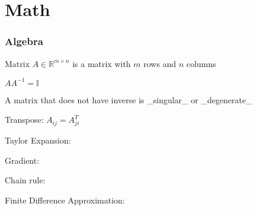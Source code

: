 \chapter{Math}

\subsection{Algebra}

Matrix $A \in\mathbb R^{m\times n}$ is a matrix with $m$ rows and $n$ columns

$AA^{-1}=\mathbb{I}$

A matrix that does not have inverse is _singular_ or _degenerate_

Transpose: $A_{ij} = A_{ji}^T$

Taylor Expansion:

Gradient:

Chain rule:

Finite Difference Approximation:

